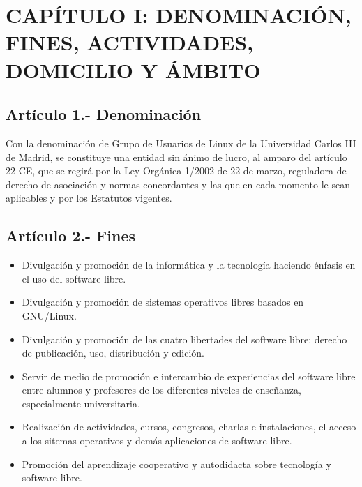 \documentclass[10pt, spanish, pdftex]{gulplantilla}
\begin{document}
\newpage {}

\tableofcontents
\newpage {}
\mdseries


\newpage {}
\section{CAPÍTULO I: DENOMINACIÓN, FINES, ACTIVIDADES, DOMICILIO Y ÁMBITO}


\subsection{Artículo 1.- Denominación}
Con la denominación de Grupo de Usuarios de Linux de la Universidad Carlos III de Madrid, se constituye una entidad sin ánimo de lucro, al amparo del artículo 22 CE, que se regirá por la Ley Orgánica 1/2002 de 22 de marzo, reguladora de derecho de asociación y normas concordantes y las que en cada momento le sean aplicables y por los Estatutos vigentes.

\subsection{Artículo 2.- Fines}
\begin{itemize}
    \item Divulgación y promoción de la informática y la tecnología haciendo énfasis en el uso del software libre.
    \item Divulgación y promoción de sistemas operativos libres basados en GNU/Linux.
    \item Divulgación y promoción de las cuatro libertades del software libre: derecho de publicación, uso, distribución y edición.
    \item Servir de medio de promoción e intercambio de experiencias del software libre entre alumnos y profesores de los diferentes niveles de enseñanza, especialmente universitaria.
    \item Realización de actividades, cursos, congresos, charlas e instalaciones, el acceso a los sitemas operativos y demás aplicaciones de software libre.
    \item Promoción del aprendizaje cooperativo y autodidacta sobre tecnología y software libre.
\end{itemize}
\end{document}
